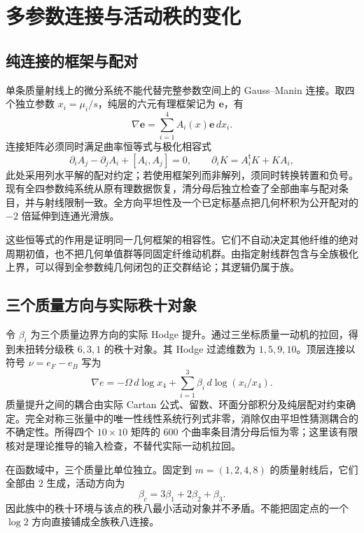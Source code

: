 \documentclass[11pt,a4paper,oneside]{ctexrep}
\theoremstyle{cnplain}
\theoremstyle{definition}
\theoremstyle{remark}
\begin{document}
\chapter{多参数连接与活动秩的变化}\label{ch:connection}
\section{纯连接的框架与配对}
单条质量射线上的微分系统不能代替完整参数空间上的 Gauss--Manin 连接。取四个独立参数 $x_i=\mu_i/s$，纯层的六元有理框架记为 $\mathbf e$，有
\begin{equation}
 \nabla\mathbf e=\sum_{i=1}^4 A_i(x)\mathbf e\,dx_i.
\end{equation}
连接矩阵必须同时满足曲率恒等式与极化相容式
\begin{equation}
 \partial_iA_j-\partial_jA_i+[A_i,A_j]=0,\qquad
 \partial_iK=A_i^{\mathsf t}K+KA_i,
\end{equation}
此处采用列水平解的配对约定；若使用框架列而非解列，须同时转换转置和负号。现有全四参数纯系统从原有理数据恢复，清分母后独立检查了全部曲率与配对条目，并与射线限制一致。全方向平坦性及一个已定标基点把几何杯积为公开配对的 $-2$ 倍延伸到连通光滑族。

这些恒等式的作用是证明同一几何框架的相容性。它们不自动决定其他纤维的绝对周期初值，也不把几何单值群等同固定纤维动机群。由指定射线群包含与全族极化上界，可以得到全参数纯几何闭包的正交群结论；其逻辑仍属于族。

\section{三个质量方向与实际秩十对象}
令 $\beta_i$ 为三个质量边界方向的实际 Hodge 提升。通过三坐标质量一动机的拉回，得到未扭转分级秩 $6,3,1$ 的秩十对象。其 Hodge 过滤维数为 $1,5,9,10$。顶层连接以符号 $\nu=e_F-e_B$ 写为
\begin{equation}
 \nabla e=-\Omega\,d\log x_4+
 \sum_{i=1}^3\beta_i\,d\log(x_i/x_4).
\end{equation}
质量提升之间的耦合由实际 Cartan 公式、留数、环面分部积分及纯层配对约束确定。完全对称三张量中的唯一性线性系统行列式非零，消除仅由平坦性猜测耦合的不确定性。所得四个 $10\times10$ 矩阵的 $600$ 个曲率条目清分母后恒为零；这里该有限核对是理论推导的输入检查，不替代实际一动机拉回。

在函数域中，三个质量比单位独立。固定到 $m=(1,2,4,8)$ 的质量射线后，它们全部由 $2$ 生成，活动方向为
\begin{equation}
 \beta_c=3\beta_1+2\beta_2+\beta_3.
\end{equation}
因此族中的秩十环境与该点的秩八最小活动对象并不矛盾。不能把固定点的一个 $\log2$ 方向直接铺成全族秩八连接。
\end{document}

